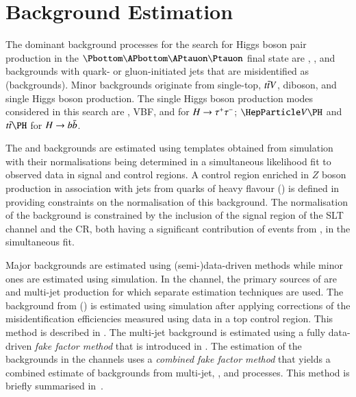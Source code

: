 \section{Background Estimation}%
\label{sec:background_estimation}

The dominant background processes for the search for Higgs boson pair
production in the $\bbtautau$ final state are \Zjets, \ttbar, and
backgrounds with quark- or gluon-initiated jets that are misidentified
as \tauhadvis (\faketauhadvis backgrounds).
Minor backgrounds originate from single-top, $t\bar{t} V$,
diboson, and single Higgs boson production.  The single Higgs boson
production modes considered in this search are \ggF, VBF, \VH and \ttH
for $H \to \tau^{+} \tau^{-}$; $\VH$ and $\ttH$ for $H \to b\bar{b}$.

The \Zjets and \ttbar backgrounds are estimated using templates
obtained from simulation with their normalisations being determined in
a simultaneous likelihood fit to observed data in signal and control
regions. A control region enriched in $Z$ boson production in
association with jets from quarks of heavy flavour (\ZHF) is defined
in  providing constraints on the normalisation of
this background. The normalisation of the \ttbar background is
constrained by the inclusion of the signal region of the \lephad SLT
channel and the \ZHF CR, both having a significant contribution of
events from \ttbar, in the simultaneous fit.

Major \faketauhadvis backgrounds are estimated using
(semi-)data-driven methods while minor ones are estimated using
simulation. In the \hadhad channel, the primary sources of
\faketauhadvis are \ttbar and multi-jet production for which separate
estimation techniques are used. The \faketauhadvis background from
\ttbar (\ttbarFakes) is estimated using simulation after applying
corrections of the \jettotauhadvis misidentification efficiencies
measured using data in a top control region. This method is described
in .  The multi-jet background is
estimated using a fully data-driven \emph{fake factor method} that is
introduced in . The estimation of the
\faketauhadvis backgrounds in the \lephad channels uses a
\emph{combined fake factor method} that yields a combined estimate of
\faketauhadvis backgrounds from multi-jet, \Wjets, and \ttbar
processes. This method is briefly summarised
in~.

